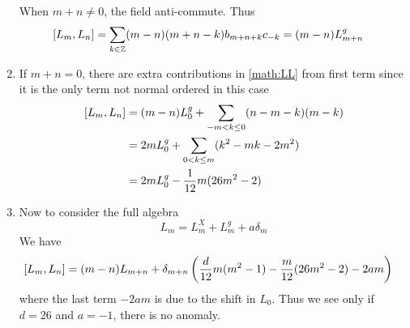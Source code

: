 \begin{enumerate}[label=(\alph*)]
		When $m+n\neq 0$, the field anti-commute. Thus 
		\begin{align}
			\comm{L_m}{L_n} &= \sum_{k\in\Z} (m-n) (m+n-k) b_{m+n+k} c_{-k} = (m - n) L_{m+n}^g
		\end{align}
	\item If $m+n = 0$, there are extra contributions in \eqref{math:LL} from first term since it is the only term not normal ordered in this case
		\begin{align*}
			\comm{L_m}{L_n} &= (m-n) L^g_0 + \sum_{-m < k \leq 0} (n-m-k)(m-k) \\
								 &= 2m L_0^g + \sum_{0 < k \leq m} (k^2 - mk - 2m^2) \\
								 &= 2mL_0^g - \frac{1}{12} m (26m^2 - 2)
		\end{align*}
		
	\item Now to consider the full algebra
		\begin{equation*}
			L_m = L_m^X + L_m^g + a \delta_m
		\end{equation*}
		We have 
		\begin{align*}
			\comm{L_m}{L_n} &= (m-n)L_{m+n} + \delta_{m+n} \left( \frac{d}{12}m(m^2-1) - \frac{m}{12} (26m^2 - 2) -2am \right) 
		\end{align*}
		where the last term $-2am$ is due to the shift in $L_{0}$. Thus we see only if $d=26$ and $a=-1$, there is no anomaly.
\end{enumerate}
